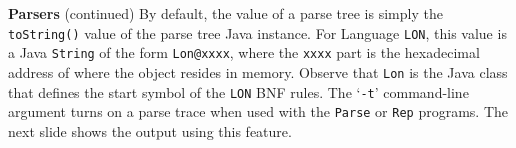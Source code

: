\begin{minipage}[t]{\sw}
\slidenumber
\LARGE
{\bf Parsers} (continued)\exx
\LARGE
\emm\LightBox{\MYlonGrammarOnly}\exx
By default, the value of a parse tree
is simply the \verb'toString()' value of the parse tree Java instance.
For Language \verb'LON',
this value is a Java \verb'String' of the form \verb'Lon@xxxx',
where the \verb'xxxx' part is the hexadecimal address
of where the object resides in memory.
Observe that \verb'Lon' is the Java class that defines
the start symbol of the \verb'LON' BNF rules.\exx
The `\verb'-t'' command-line argument turns on a parse trace
when used with the \verb'Parse' or \verb'Rep' programs.
The next slide shows the output using this feature.
\end{minipage}
\clearpage
